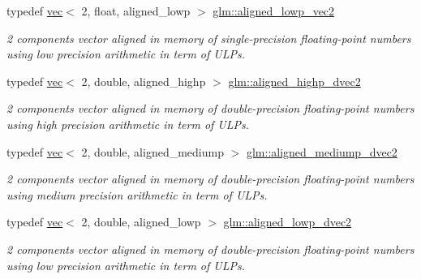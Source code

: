 \begin{DoxyCompactItemize}
\mbox{\label{group__gtc__type__aligned_ga10048e69ffac79ec5ea059398485114e}} 
typedef \hyperlink{structglm_1_1vec}{vec}$<$ 2, float, aligned\+\_\+lowp $>$ \hyperlink{group__gtc__type__aligned_ga10048e69ffac79ec5ea059398485114e}{glm\+::aligned\+\_\+lowp\+\_\+vec2}
\begin{DoxyCompactList}\small\item\em 2 components vector aligned in memory of single-\/precision floating-\/point numbers using low precision arithmetic in term of U\+L\+Ps. \end{DoxyCompactList}\item 
\mbox{\label{group__gtc__type__aligned_gadc0edec95aa740d8ec351ef1e2dd39de}} 
typedef \hyperlink{structglm_1_1vec}{vec}$<$ 2, double, aligned\+\_\+highp $>$ \hyperlink{group__gtc__type__aligned_gadc0edec95aa740d8ec351ef1e2dd39de}{glm\+::aligned\+\_\+highp\+\_\+dvec2}
\begin{DoxyCompactList}\small\item\em 2 components vector aligned in memory of double-\/precision floating-\/point numbers using high precision arithmetic in term of U\+L\+Ps. \end{DoxyCompactList}\item 
\mbox{\label{group__gtc__type__aligned_gab67579d5dcc90f9e4ab28cc92a467eee}} 
typedef \hyperlink{structglm_1_1vec}{vec}$<$ 2, double, aligned\+\_\+mediump $>$ \hyperlink{group__gtc__type__aligned_gab67579d5dcc90f9e4ab28cc92a467eee}{glm\+::aligned\+\_\+mediump\+\_\+dvec2}
\begin{DoxyCompactList}\small\item\em 2 components vector aligned in memory of double-\/precision floating-\/point numbers using medium precision arithmetic in term of U\+L\+Ps. \end{DoxyCompactList}\item 
\mbox{\label{group__gtc__type__aligned_ga82d3a1058d43fa4547f56e8d5c7fb5ca}} 
typedef \hyperlink{structglm_1_1vec}{vec}$<$ 2, double, aligned\+\_\+lowp $>$ \hyperlink{group__gtc__type__aligned_ga82d3a1058d43fa4547f56e8d5c7fb5ca}{glm\+::aligned\+\_\+lowp\+\_\+dvec2}
\begin{DoxyCompactList}\small\item\em 2 components vector aligned in memory of double-\/precision floating-\/point numbers using low precision arithmetic in term of U\+L\+Ps. \end{DoxyCompactList}\item 

\end{DoxyCompactItemize}
